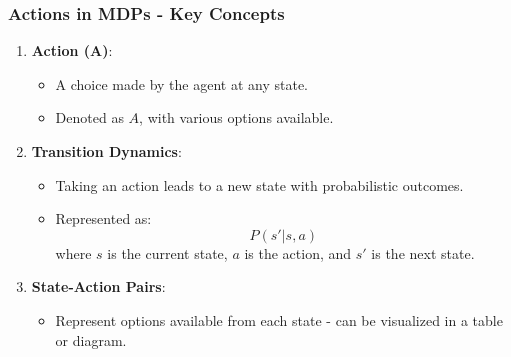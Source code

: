 \documentclass[aspectratio=169]{beamer}
\begin{document}
\begin{frame}[fragile]
    \frametitle{Actions in MDPs - Key Concepts}
    \begin{enumerate}
        \item \textbf{Action (A)}:
        \begin{itemize}
            \item A choice made by the agent at any state.
            \item Denoted as \( A \), with various options available.
        \end{itemize}
        \item \textbf{Transition Dynamics}:
        \begin{itemize}
            \item Taking an action leads to a new state with probabilistic outcomes.
            \item Represented as:
            \[
            P(s' | s, a)
            \]
            where \( s \) is the current state, \( a \) is the action, and \( s' \) is the next state.
        \end{itemize}
        \item \textbf{State-Action Pairs}:
        \begin{itemize}
            \item Represent options available from each state - can be visualized in a table or diagram.
        \end{itemize}
    \end{enumerate}
\end{frame}
\end{document}
